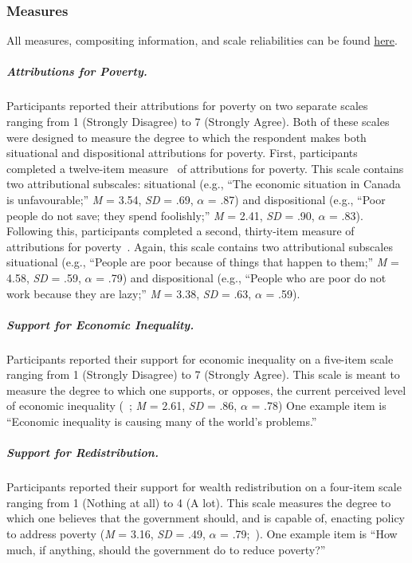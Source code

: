\documentclass{sfuthesis}
\begin{document}
\subsubsection{Measures}
All measures, compositing information, and scale reliabilities can be found \href{https://github.com/dwiwad/Dissertation/tree/master/Study\%202a\%20and\%202b}{here}.

\subparagraph{Attributions for Poverty.} Participants reported their attributions for poverty on two separate scales ranging from 1 (Strongly Disagree) to 7 (Strongly Agree). Both of these scales were designed to measure the degree to which the respondent makes both situational and dispositional attributions for poverty. First, participants completed a twelve-item measure~\cite{guimond89} of attributions for poverty. This scale contains two attributional subscales: situational (e.g., “The economic situation in Canada is unfavourable;” \textit{M} = 3.54, \textit{SD} = .69, $\alpha$ = .87) and dispositional (e.g., “Poor people do not save; they spend foolishly;” \textit{M} = 2.41, \textit{SD} = .90, $\alpha$ = .83). Following this, participants completed a second, thirty-item measure of attributions for poverty~\cite{nickols11}. Again, this scale contains two attributional subscales situational (e.g., “People are poor because of things that happen to them;” \textit{M} = 4.58, \textit{SD} = .59, $\alpha$ = .79) and dispositional (e.g., “People who are poor do not work because they are lazy;” \textit{M} = 3.38, \textit{SD} = .63, $\alpha$ = .59).

\subparagraph{Support for Economic Inequality.} Participants reported their support for economic inequality on a five-item scale ranging from 1 (Strongly Disagree) to 7 (Strongly Agree). This scale is meant to measure the degree to which one supports, or opposes, the current perceived level of economic inequality (~\cite{wiwadunpub}; \textit{M} = 2.61, \textit{SD} = .86, $\alpha$ = .78) One example item is “Economic inequality is causing many of the world’s problems.”

\subparagraph{Support for Redistribution.} Participants reported their support for wealth redistribution on a four-item scale ranging from 1 (Nothing at all) to 4 (A lot). This scale measures the degree to which one believes that the government should, and is capable of, enacting policy to address poverty (\textit{M} = 3.16, \textit{SD} = .49, $\alpha$ = .79;~\cite{inglehart}). One example item is “How much, if anything, should the government do to reduce poverty?”
	
\end{document}

